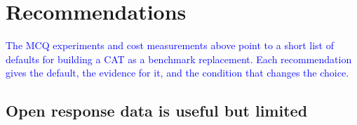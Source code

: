 %
%
%
%

\providecommand{\aiadd}[1]{\textcolor{blue}{#1}}
\providecommand{\aibullets}[1]{{\color{blue}#1}}

\section{Recommendations}

\aiadd{The MCQ experiments and cost measurements above point to a short list of
defaults for building a CAT as a benchmark replacement. Each recommendation
gives the default, the evidence for it, and the condition that changes the
choice.}

\subsection{Open response data is useful but limited}

